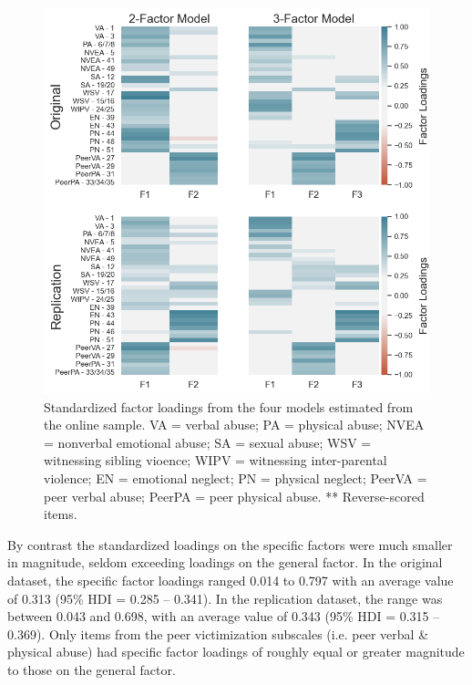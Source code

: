 \documentclass[letterpaper,man,natbib,floatsintext,longtable]{apa6}
\begin{document}
\begin{figure}[h!]
    \centering
    \includegraphics[width=1.1\textwidth,center]{figures/fig03.png}
    \caption{Standardized factor loadings from the four models estimated from the online sample. VA = verbal abuse; PA = physical abuse; NVEA = nonverbal emotional abuse; SA = sexual abuse; WSV = witnessing sibling vioence; WIPV = witnessing inter-parental violence; EN = emotional neglect; PN = physical neglect; PeerVA = peer verbal abuse; PeerPA = peer physical abuse. ** Reverse-scored items.}
    \label{fig:loadings_online}
\end{figure}

By contrast the standardized loadings on the specific factors were much smaller in magnitude, seldom exceeding loadings on the general factor. In the original dataset, the specific factor loadings ranged 0.014 to 0.797 with an average value of 0.313 (95\% HDI = 0.285 -- 0.341). In the replication dataset, the range was between 0.043 and 0.698, with an average value of 0.343 (95\% HDI = 0.315 -- 0.369). Only items from the peer victimization subscales (i.e. peer verbal \& physical abuse) had specific factor loadings of roughly equal or greater magnitude to those on the general factor. 
\end{document}
